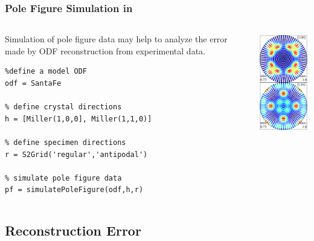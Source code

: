 \begin{frame}[fragile]
  \frametitle{Pole Figure Simulation in \mtex}

  \begin{columns}
    \begin{column}{8cm}

      Simulation of pole figure data may help to analyze the error made by ODF
      reconstruction from experimental data.

\begin{lstlisting}
%define a model ODF
odf = SantaFe

% define crystal directions
h = [Miller(1,0,0], Miller(1,1,0)]

% define specimen directions
r = S2Grid('regular','antipodal')

% simulate pole figure data
pf = simulatePoleFigure(odf,h,r)
\end{lstlisting}
    \end{column}

    \begin{column}{4cm}
      \centerline{
      \includegraphics[width=4cm]{pic/simpf}}
    \end{column}

  \end{columns}

\end{frame}

\subsection*{Reconstruction Error}

